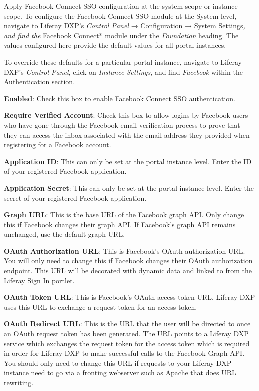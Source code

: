 Apply Facebook Connect SSO configuration at the system scope or instance
scope. To configure the Facebook Connect SSO module at the System level,
navigate to Liferay DXP's \emph{Control Panel} → Configuration → System
Settings\emph{, and find the }Facebook Connect* module under the
\emph{Foundation} heading. The values configured here provide the
default values for all portal instances.

To override these defaults for a particular portal instance, navigate to
Liferay DXP's \emph{Control Panel}, click on \emph{Instance Settings},
and find \emph{Facebook} within the Authentication section.

\textbf{Enabled}: Check this box to enable Facebook Connect SSO
authentication.

\textbf{Require Verified Account}: Check this box to allow logins by
Facebook users who have gone through the Facebook email verification
process to prove that they can access the inbox associated with the
email address they provided when registering for a Facebook account.

\textbf{Application ID}: This can only be set at the portal instance
level. Enter the ID of your registered Facebook application.

\textbf{Application Secret}: This can only be set at the portal instance
level. Enter the secret of your registered Facebook application.

\textbf{Graph URL}: This is the base URL of the Facebook graph API. Only
change this if Facebook changes their graph API. If Facebook's graph API
remains unchanged, use the default graph URL.

\textbf{OAuth Authorization URL}: This is Facebook's OAuth authorization
URL. You will only need to change this if Facebook changes their OAuth
authorization endpoint. This URL will be decorated with dynamic data and
linked to from the Liferay Sign In portlet.

\textbf{OAuth Token URL}: This is Facebook's OAuth access token URL.
Liferay DXP uses this URL to exchange a request token for an access
token.

\textbf{OAuth Redirect URL}: This is the URL that the user will be
directed to once an OAuth request token has been generated. The URL
points to a Liferay DXP service which exchanges the request token for
the access token which is required in order for Liferay DXP to make
successful calls to the Facebook Graph API. You should only need to
change this URL if requests to your Liferay DXP instance need to go via
a fronting webserver such as Apache that does URL rewriting.

